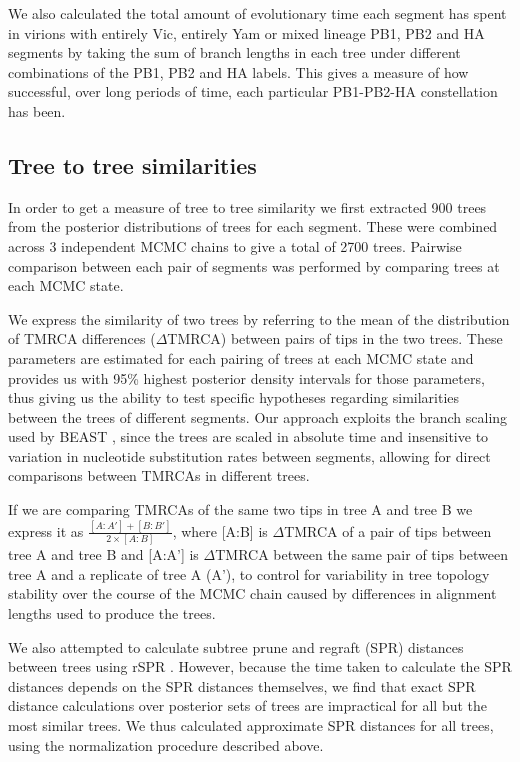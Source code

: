 \documentclass[11pt,oneside,letterpaper]{article}
\begin{document}
We also calculated the total amount of evolutionary time each segment has spent in virions with entirely Vic, entirely Yam or mixed lineage PB1, PB2 and HA segments by taking the sum of branch lengths in each tree under different combinations of the PB1, PB2 and HA labels.
This gives a measure of how successful, over long periods of time, each particular PB1-PB2-HA constellation has been.

\subsection*{Tree to tree similarities}
In order to get a measure of tree to tree similarity we first extracted 900 trees from the posterior distributions of trees for each segment.
These were combined across 3 independent MCMC chains to give a total of 2700 trees.
Pairwise comparison between each pair of segments was performed by comparing trees at each MCMC state.

We express the similarity of two trees by referring to the mean of the distribution of TMRCA differences ($\Delta$TMRCA) between pairs of tips in the two trees.
These parameters are estimated for each pairing of trees at each MCMC state and provides us with 95\% highest posterior density intervals for those parameters, thus giving us the ability to test specific hypotheses regarding similarities between the trees of different segments.
Our approach exploits the branch scaling used by BEAST \cite{drummond2012}, since the trees are scaled in absolute time and insensitive to variation in nucleotide substitution rates between segments, allowing for direct comparisons between TMRCAs in different trees.

If we are comparing TMRCAs of the same two tips in tree A and tree B we express it as $\frac{[A:A']+[B:B']}{2\times [A:B]}$, where [A:B] is $\Delta$TMRCA of a pair of tips between tree A and tree B and [A:A'] is $\Delta$TMRCA between the same pair of tips between tree A and a replicate of tree A (A'), to control for variability in tree topology stability over the course of the MCMC chain caused by differences in alignment lengths used to produce the trees.

We also attempted to calculate subtree prune and regraft (SPR) distances between trees using rSPR \cite{whidden2009,whidden2010,whidden2013}.
However, because the time taken to calculate the SPR distances depends on the SPR distances themselves, we find that exact SPR distance calculations over posterior sets of trees are impractical for all but the most similar trees.
We thus calculated approximate SPR distances for all trees, using the normalization procedure described above.
\end{document}
